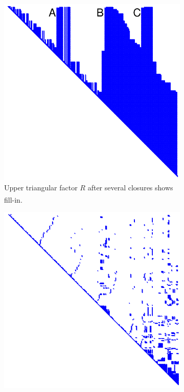 \begin{figure}[H]
\begin{minipage}[t]{0.48\linewidth}
        \begin{subfigure}[t]{0.49\linewidth}
            \centering
            \includegraphics[width=\linewidth,height=0.20\textheight,keepaspectratio]{Pictures/Optimizers/iSAM/Variable_Reordering2.png}
            \caption{Upper triangular factor $R$ after several closures shows fill-in.\textsuperscript{\cite{iSAM_paper}}}\label{fig:l-bot-left}
        \end{subfigure}\hfill
        \begin{subfigure}[t]{0.49\linewidth}
            \centering
            \includegraphics[width=\linewidth,height=0.20\textheight,keepaspectratio]{Pictures/Optimizers/iSAM/Variable_Reordering3.png}

\end{subfigure}
\end{minipage}
\end{figure}
